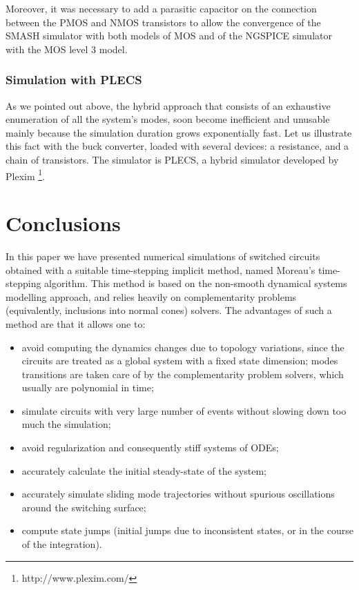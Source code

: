 \documentclass{article}
\begin{document}
Moreover, it was necessary to add a parasitic capacitor on the connection between the PMOS and NMOS
transistors to allow the convergence of the SMASH simulator with both models of MOS
and of the NGSPICE simulator with the MOS level 3 model.


\subsubsection{Simulation with PLECS}

As we pointed out above, the hybrid approach that consists of an exhaustive enumeration of all the system's modes, soon become inefficient and unusable mainly because the simulation duration grows exponentially fast. Let us illustrate this fact with the buck converter, loaded with several devices: a resistance, and a chain of transistors. The simulator is PLECS, a hybrid simulator developed by Plexim \footnote{http://www.plexim.com/}. 




\section{Conclusions}
\label{section5}


In this paper we have presented numerical simulations of switched circuits obtained with a suitable time-stepping implicit method, named Moreau's time-stepping algorithm. This method is based on the non-smooth dynamical systems modelling approach, and relies heavily on complementarity problems (equivalently, inclusions into normal cones) solvers. The advantages of such a method are that it allows one to:

\begin{itemize}

\item avoid computing the dynamics changes due to topology variations, since the circuits are treated as a global system with a fixed state dimension; modes transitions are taken care of by the complementarity problem solvers, which usually are polynomial in time;

\item simulate circuits with very large number of events without slowing down too much the simulation;

\item avoid regularization and consequently stiff systems of ODEs;

\item accurately calculate the initial steady-state of the system;

\item accurately simulate sliding mode trajectories without spurious oscillations around the switching surface;

\item compute state jumps (initial jumps due to inconsistent states, or in the course of the integration). 

\end{itemize}
\end{document}
